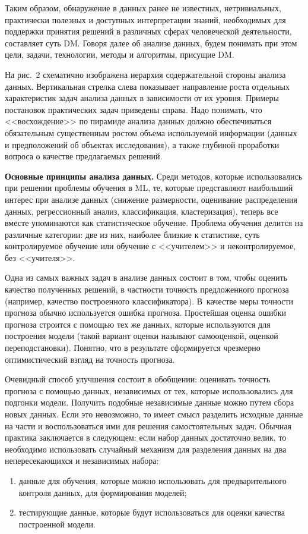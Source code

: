 \begin{multicols}{2}
      Таким образом, обнаружение в данных ранее не известных, нетривиальных, 
практически полезных и доступных интерпретации знаний, необходимых для поддержки 
принятия решений в различных сферах человеческой деятельности, составляет суть DM. 
Говоря далее об анализе данных, будем понимать при этом цели, задачи, технологии, методы и 
алгоритмы, присущие DM. 
      
      На рис.~2 схематично изображена иерархия содержательной стороны анализа данных. 
Вертикальная стрелка слева показывает направление роста отдельных характеристик задач 
анализа данных в зависимости от их уровня. Примеры постановок практических задач 
приведены справа. Надо понимать, что <<восхождение>> по пирамиде анализа данных 
должно обеспечиваться обязательным существенным ростом объема используемой 
информации (данных и предположений об объектах исследования), а также глубиной 
проработки вопроса о качестве предлагаемых решений.


      
      \textbf{Основные принципы анализа данных.} Среди методов, которые 
использовались при решении проб\-ле\-мы обучения в ML, те, которые представляют\linebreak 
наибольший интерес при анализе данных (снижение размерности, оценивание распределения 
данных, регрессионный анализ, классификация, клас\-те\-ри\-за\-ция), теперь все вместе 
упоминаются как статисти\-ческое обучение. Проблема обучения делится на различные 
категории: две из них, наиболее близкие к статистике, суть контролируемое обучение или 
обучение с <<учителем>> и не\-конт\-ро\-ли\-ру\-емое, без <<учителя>>.
      
      Одна из самых важных задач в анализе данных состоит в том, чтобы оценить качество 
полученных решений, в частности точность предложенного прогноза (например, качество 
построенного классификатора). В~качестве меры точности прогноза обычно используется 
ошибка прогноза. Простейшая оценка ошибки прогноза строится с помощью тех же данных, 
которые используются для построения модели (такой вариант оценки называют самооценкой, 
оценкой переподстановки). Понятно, что в результате сформируется чрезмерно 
оптимистический взгляд на точность прогноза. 
      
      Очевидный способ улучшения состоит в обобщении: оценивать точность прогноза с 
помощью данных, независимых от тех, которые использовались для подгонки модели. 
Получить подобные независимые данные можно путем сбора новых данных. Если это 
невозможно, то имеет смысл разделить исходные данные на части и воспользоваться ими для 
решения самостоятельных задач. Обычная практика заключается в следующем: если набор 
данных достаточно велик, то необходимо использовать случайный механизм для разделения 
данных на два непересекающихся и независимых набора: 
      \begin{enumerate}[(1)]
\item данные для обучения, которые можно использовать для предварительного контроля 
данных, для формирования моделей;
\item тестирующие данные, которые будут использоваться для оценки 
качества построенной модели.
      \end{enumerate}
      

\end{multicols}
